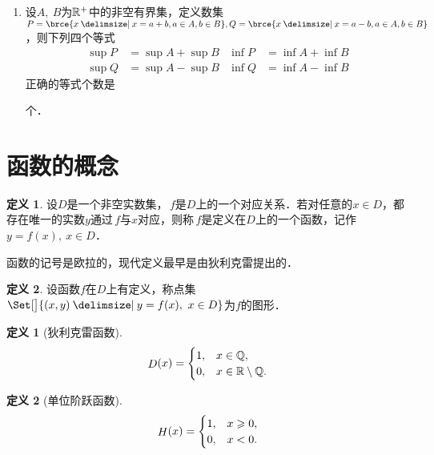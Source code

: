 \documentclass[a4paper,punct=CCT]{ctexbook}
\theoremstyle{definition}
\newtheorem{definition}{定义}
\newtheorem*{definition*}{定义}
\theoremstyle{remark}
\newif\ifshowsol
\let\geq\geqslant
\let\ge\geq}
\begin{document}
\begin{enumerate}
\item 设\(A,\ B\)为\(\mathbb{R}^+\)中的非空有界集，定义数集\(P = \brce{x \mid x = a + b, a \in A, b \in B}, Q = \brce{x \mid x = a - b, a \in A, b \in B}\)，则下列四个等式
  \begin{align*}
    \sup P &= \sup A + \sup B & \inf P &= \inf A + \inf B \\
    \sup Q &= \sup A - \sup B & \inf Q &= \inf A - \inf B
  \end{align*}
  正确的等式个数是
  \ifshowsol
  \uline{\makebox[4em]{\(2\)}}%
  \else
  \uline{\makebox[4em]{}}%
  \fi
  个．

  \ifshowsol
  前两个等式是正确的，后两个改成\(\sup Q = \sup A - \inf B\)和\(\inf Q = \inf A - \sup B\)就正确了．
  \fi
\end{enumerate}
\fi

\section{函数的概念}

\begin{definition*}
  设\(D\)是一个非空实数集，\(\,f\)是\(D\)上的一个对应关系．若对任意的\(x \in D\)，都存在唯一的实数\(y\)通过\(\,f\)与\(x\)对应，则称\(\,f\)是定义在\(D\)上的一个函数，记作\(y = f(x),\ x \in D\)．
\end{definition*}

函数的记号是欧拉的，现代定义最早是由狄利克雷提出的．

\begin{definition*}
  设函数\(f\)在\(D\)上有定义，称点集\(\Set[\big]{(x,y) \mid y = f(x),\ x \in D}\)为\(f\)的图形．
\end{definition*}

\begin{definition}[狄利克雷函数]
  \label{defn:dirichlet}
  \[
    \mathop{\relax D}\nolimits(x) =
    \begin{cases}
      1, & x \in \mathbb{Q}, \\
      0, & x \in \mathbb{R} \setminus \mathbb{Q}.
    \end{cases}
  \]
\end{definition}

\begin{definition}[单位阶跃函数]
  \label{defn:heaviside}
  \[
    \Fn H(x) =
    \begin{cases}
      1, & x \ge 0, \\
      0, & x < 0.
    \end{cases}
  \]
\end{definition}
\end{document}

